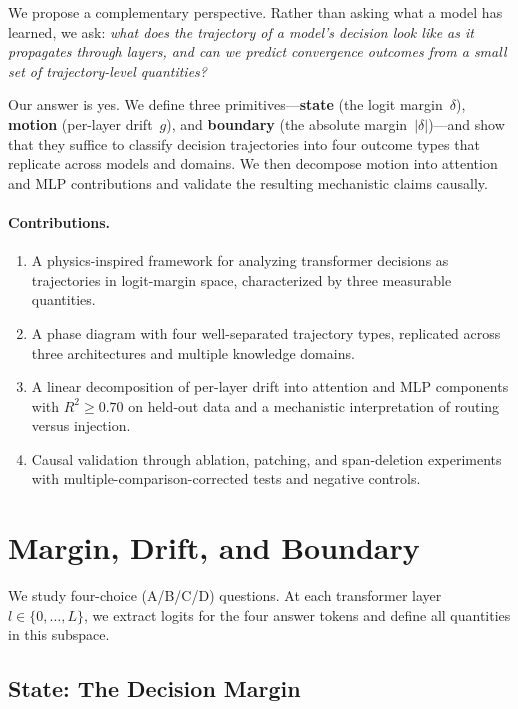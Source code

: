 \documentclass{article}
\begin{document}
We propose a complementary perspective.  Rather than asking what a model has learned, we ask: \emph{what does the trajectory of a model's decision look like as it propagates through layers, and can we predict convergence outcomes from a small set of trajectory-level quantities?}

Our answer is yes.  We define three primitives---\textbf{state} (the logit margin~$\delta$), \textbf{motion} (per-layer drift~$g$), and \textbf{boundary} (the absolute margin~$|\delta|$)---and show that they suffice to classify decision trajectories into four outcome types that replicate across models and domains.  We then decompose motion into attention and MLP contributions and validate the resulting mechanistic claims causally.

\paragraph{Contributions.}
\begin{enumerate}
\item A physics-inspired framework for analyzing transformer decisions as trajectories in logit-margin space, characterized by three measurable quantities.
\item A phase diagram with four well-separated trajectory types, replicated across three architectures and multiple knowledge domains.
\item A linear decomposition of per-layer drift into attention and MLP components with $R^2 \geq 0.70$ on held-out data and a mechanistic interpretation of routing versus injection.
\item Causal validation through ablation, patching, and span-deletion experiments with multiple-comparison-corrected tests and negative controls.
\end{enumerate}


\section{Margin, Drift, and Boundary}
\label{sec:primitives}

We study four-choice (A/B/C/D) questions.  At each transformer layer $l \in \{0,\ldots,L\}$, we extract logits for the four answer tokens and define all quantities in this subspace.

\subsection{State: The Decision Margin}
\end{document}
